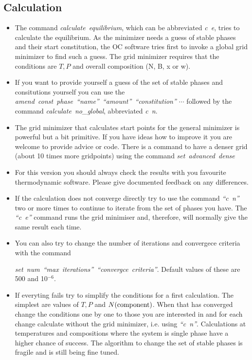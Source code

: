 \documentclass[12pt]{article}
\begin{document}
\subsection{Calculation}

\begin{itemize}
\item The command {\em calculate~equilibrium}, which can be
  abbreviated {\em c~e}, tries to calculate the equilibrium.  As the
  minimizer needs a guess of stable phases and their start
  constitution, the OC software tries first to invoke a global grid
  minimizer to find such a guess.  The grid minimizer requires that
  the conditions are $T, P$ and overall composition (N, B, x or w).

\item If you want to provide yourself a guess of the set of stable
  phases and consitutions yourself you can use the {\em
    amend~const~phase~``name''~``amount''~``constitution'' $\cdots$}
  followed by the command {\em calculate~no\_global}, abbreviated {\em
    c~n}.

\item The grid minimizer that calculates start points for the general
  minimizer is powerful but a bit primitive.  If you have ideas how to
  improve it you are welcome to provide advice or code.  There is
  a command to have a denser grid (about 10 times more gridpoints) using
  the command {\em set~advanced~dense}

\item For this version you should always check the results with you
  favourite thermodynamic software.  Please give documented feedback
  on any differences.

\item If the calculation does not converge directly try to use the
  command {\em ``c~n''} two or more times to continue to iterate from
  the set of phases you have.  The {\em ``c~e''} command runs the grid
  minimiser and, therefore, will normally give the same result each
  time.

\item You can also try to change the number of iterations and
  convergece criteria with the command

  {\em set~num~``max~iterations''~``convergce~criteria''}.  Default
  values of these are 500 and 10$^{-6}$.

\item If everyting fails try to simplify the conditions for a first
  calculation.  The simplest are values of $T, P$ and $N(\rm
  component)$. When that has converged change the conditions one by
  one to those you are interested in and for each change calculate
  without the grid minimizer, i.e.  using {\em ``c~n''}.  Calculations
  at temperatures and compositions where the system is single phase
  have a higher chance of success.  The algorithm to change the set of
  stable phases is fragile and is still being fine tuned.


\end{itemize}
\end{document}
